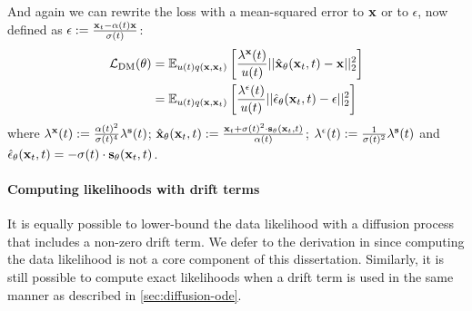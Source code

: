 And again we can rewrite the loss with a mean-squared error to ${\mathbf{x}}$ or to $\epsilon$, now defined as $\epsilon := \frac{{\mathbf{x}}_t-\alpha(t){\mathbf{x}}}{\sigma(t)}$:
\begin{align}
    \mathcal{L}_\text{DM}(\theta) &= \mathbb{E}_{u(t)q({\mathbf{x}}, {\mathbf{x}}_t)} \left[ \frac{\lambda^{\mathbf{x}}(t)}{u(t)} || \hat{{\mathbf{x}}}_\theta({\mathbf{x}}_t, t) - {\mathbf{x}} ||_2^2 \right] \label{eq:diffusion-general-x-prediction} \\
     &= \mathbb{E}_{u(t)q({\mathbf{x}}, {\mathbf{x}}_t)} \left[ \frac{\lambda^\epsilon(t)}{u(t)} || \hat{\mathbf{\epsilon}}_\theta({\mathbf{x}}_t, t) - \epsilon ||_2^2 \right] \label{eq:diffusion-general-epsilon-prediction}
\end{align}
where $\lambda^{\mathbf{x}}(t) := \frac{\alpha(t)^2}{\sigma(t)^4}\lambda^{\mathbf{s}}(t)$; $\hat{{\mathbf{x}}}_\theta({\mathbf{x}}_t, t) := \frac{{\mathbf{x}}_t + \sigma(t)^2 \cdot {\mathbf{s}}_\theta({\mathbf{x}}_t, t)}{\alpha(t)}$; $\lambda^\epsilon(t) := \frac{1}{\sigma(t)^2} \lambda^{\mathbf{s}}(t)$ and $\hat{\mathbf{\epsilon}}_\theta({\mathbf{x}}_t, t) = - \sigma(t) \cdot {\mathbf{s}}_\theta({\mathbf{x}}_t, t)$.

\paragraph{Computing likelihoods with drift terms}
It is equally possible to lower-bound the data likelihood with a diffusion process that includes a non-zero drift term. We defer to the derivation in \citet{kingma2021variational} since computing the data likelihood is not a core component of this dissertation. Similarly, it is still possible to compute exact likelihoods when a drift term is used in the same manner as described in \cref{sec:diffusion-ode}.